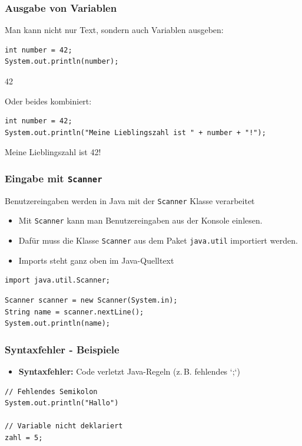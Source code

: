 \documentclass{../../presentation}
\begin{document}
\begin{frame}[fragile]
  \frametitle{Ausgabe von Variablen}
  \pause
  Man kann nicht nur Text, sondern auch Variablen ausgeben:
  \pause
  \begin{verbatim}
int number = 42;
System.out.println(number);
  \end{verbatim}
  \begin{ausgabe}
    42
  \end{ausgabe}
  \pause
  Oder beides kombiniert:
  \begin{verbatim}
int number = 42;
System.out.println("Meine Lieblingszahl ist " + number + "!");
  \end{verbatim}
  \pause
  \begin{ausgabe}
    Meine Lieblingszahl ist 42!
  \end{ausgabe}
\end{frame}

\begin{frame}[fragile]
  \frametitle{Eingabe mit \texttt{Scanner}}
  \pause
  Benutzereingaben werden in Java mit der \texttt{Scanner} Klasse verarbeitet
  \begin{itemize}
    \item Mit \texttt{Scanner} kann man Benutzereingaben aus der Konsole einlesen.
    \item Dafür muss die Klasse \texttt{Scanner} aus dem Paket \texttt{java.util} importiert werden.
    \item Imports steht ganz oben im Java-Quelltext
  \end{itemize}
  \pause
  \begin{verbatim}
import java.util.Scanner;
\end{verbatim}
  \pause
  \begin{verbatim}
Scanner scanner = new Scanner(System.in);
String name = scanner.nextLine();
System.out.println(name);
  \end{verbatim}
\end{frame}

\begin{frame}[fragile]
  \frametitle{Syntaxfehler - Beispiele}
  \pause
  \begin{itemize}
    \item \textbf{Syntaxfehler:} Code verletzt Java-Regeln (z.\,B. fehlendes `;`)
  \end{itemize}
  \begin{verbatim}
// Fehlendes Semikolon
System.out.println("Hallo")

// Variable nicht deklariert
zahl = 5;
  \end{verbatim}
\end{frame}
\end{document}

